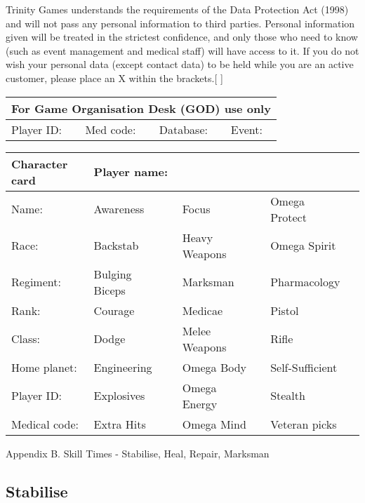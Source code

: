 \documentclass{scrbook}
\begin{document}
	Trinity Games understands the requirements of the Data Protection Act (1998) and will not pass any personal information to third parties. Personal information given will be treated in the strictest confidence, and only those who need to know (such as event management and medical staff) will have access to it. If you do not wish your personal data (except contact data) to be held while you are an active customer, please place an X within the brackets.{[} {]}

\begin{table}
\begin{tabular}{|l|l|l|l|} \hline 
\multicolumn{4}{|l|}{\textbf{For Game Organisation Desk (GOD) use only}} \\
 \hline Player ID: & Med code: & Database: & Event: \\
 \hline \end{tabular}

\end{table}

\begin{table}
\begin{tabular}{|l|l|l|l|l|l|l|} \hline 
\textbf{Character card} & \multicolumn{6}{|l|}{\textbf{Player name:}} \\
 \hline Name: & Awareness &  & Focus &  & Omega Protect &  \\
 \hline Race: & Backstab &  & Heavy Weapons &  & Omega Spirit &  \\
 \hline Regiment: & Bulging Biceps &  & Marksman &  & Pharmacology &  \\
 \hline Rank: & Courage &  & Medicae &  & Pistol &  \\
 \hline Class: & Dodge &  & Melee Weapons &  & Rifle &  \\
 \hline Home planet: & Engineering &  & Omega Body &  & Self-Sufficient &  \\
 \hline Player ID: & Explosives &  & Omega Energy &  & Stealth &  \\
 \hline Medical code: & Extra Hits &  & Omega Mind &  & Veteran picks &  \\
 \hline \end{tabular}

\end{table}

Appendix B. Skill Times - Stabilise, Heal, Repair, Marksman

\subsection{Stabilise}
\end{document}
